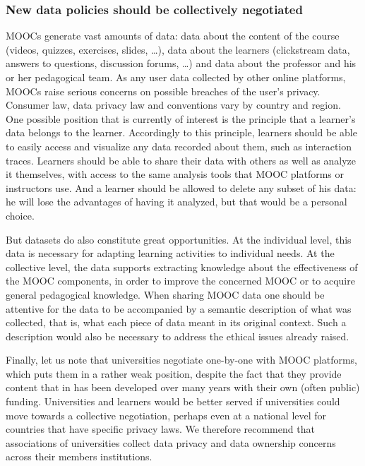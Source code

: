 \documentclass[a4paper,UKenglish]{dagman}
\begin{document}
\subsubsection*{New data policies should be collectively negotiated}
MOOCs generate vast amounts of data: data about the content of the course (videos, quizzes,
exercises, slides, \ldots), data about the learners (clickstream data, answers to questions,
discussion forums, \ldots) and data about the professor and his or her pedagogical team. As any user
data collected by other online platforms, MOOCs raise serious concerns on possible breaches of the
user's privacy. 
      Consumer law, data privacy law and conventions vary by country and region.
      One possible position that is currently of interest is the
      principle that a learner’s data belongs to the learner.
Accordingly to this principle, learners should be able to easily access and visualize any data
recorded about them, such as interaction traces.  Learners should be able to share their data with
others as well as analyze it themselves, with access to the same analysis tools that MOOC platforms
or instructors use.  And a learner should be allowed to delete any subset of his data: he will lose
the advantages of having it analyzed, but that would be a personal choice.

But datasets do also constitute great opportunities. At the individual level, this data is necessary
for adapting learning activities to individual needs. At the collective level, the data supports
extracting knowledge about the effectiveness of the MOOC components, in order to improve the
concerned MOOC or to acquire general pedagogical knowledge. When sharing MOOC data one should be
attentive for the data to be accompanied by a semantic description of what was collected, that is,
what each piece of data meant in its original context. Such a description would also be necessary to
address the ethical issues already raised.

Finally, let us note that universities negotiate one-by-one with MOOC platforms, which puts them in
a rather weak position, despite the fact that they provide content that in has been developed over
many years with their own (often public) funding.  Universities and learners would be better served
if universities could move towards a collective negotiation, perhaps even at a national level for
countries that have specific privacy laws.  We therefore recommend that associations of universities
collect data privacy and data ownership concerns across their members institutions.
\end{document}
